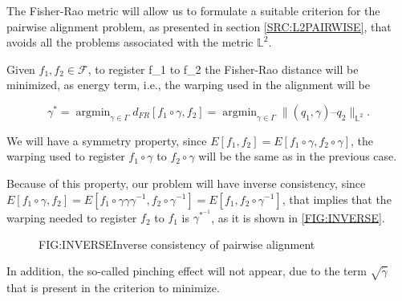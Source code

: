 
The Fisher-Rao metric will allow us to formulate a suitable criterion for the
pairwise alignment problem, as presented in section \ref{SRC:L2PAIRWISE},
 that avoids all the problems associated with the metric $\mathbb{L}^2$.

Given $f_1, f_2 \in \mathscr{F}$, to register f_1 to f_2 the Fisher-Rao distance
will be minimized, as energy term, i.e., the warping used in the alignment will be

$$
\gamma^{*}= \operatorname{argmin}_{\gamma \in \Gamma} d_{FR}[f_1 \circ \gamma,
f_2] = \operatorname{argmin}_{\gamma \in \Gamma} \|
(q_1, \gamma) – q_2 \|_{\mathbb{L}^2}.
$$

We will have a symmetry property, since
$E[f_1, f_2] = E[f_1 \circ \gamma, f_2 \circ \gamma]$, the warping used to
register $f_1 \circ \gamma$ to $f_2 \circ \gamma$ will be the same as in the
previous case.

Because of this property, our problem will have inverse consistency, since
$E[f_1 \circ \gamma, f_2] = E[f_1 \circ \gamma \gamma \gamma^{-1}, f_2
\circ \gamma^{-1}] = E[f_1, f_2 \circ \gamma^{-1}]$, that implies that the
warping needed to register $f_2$ to $f_1$  is $\gamma^*^{-1}$, as it is shown in
\ref{FIG:INVERSE}.

\begin{figure}[Inverse consistency of pairwise alignment]{FIG:INVERSE}{Inverse consistency of pairwise alignment}
   \quad
\end{figure}

In addition, the so-called pinching effect will not appear, due to the term
$\sqrt{\dot \gamma}$ that is present in the criterion to minimize.
